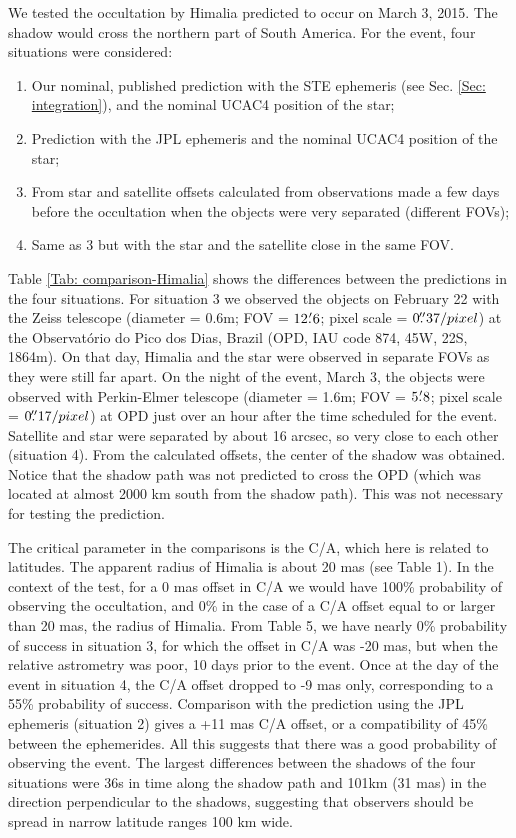 \documentclass[useAMS,usenatbib]{mn2e}
\begin{document}
We tested the occultation by Himalia predicted to occur on March 3, 2015. The shadow would cross the northern part of South America. For the event, four situations were considered:
\begin{enumerate}[I]
\item Our nominal, published prediction with the STE ephemeris (see Sec. \ref{Sec: integration}), and the nominal UCAC4 position of the star;
\item Prediction with the JPL ephemeris and the nominal UCAC4 position of the star;
\item From star and satellite offsets calculated from observations made a few days before the occultation when the objects were very separated (different FOVs);
\item Same as 3 but with the star and the satellite close in the same FOV.
\end{enumerate}

Table \ref{Tab: comparison-Himalia} shows the differences between the predictions in the four situations. For situation 3 we observed the objects on February 22 with the Zeiss telescope (diameter = 0.6m; FOV = $12\hbox{$.\mkern-4mu^\prime$}6$; pixel scale = $0\hbox{$.\!\!^{\prime\prime}$}37 / pixel$) at the Observatório do Pico dos Dias, Brazil (OPD, IAU code 874, 45\arcsec W, 22\arcsec S, 1864m). On that day, Himalia and the star were observed in separate FOVs as they were still far apart. On the night of the event, March 3, the objects were observed with Perkin-Elmer telescope (diameter = 1.6m; FOV = $5\hbox{$.\mkern-4mu^\prime$}8$; pixel scale = $0\hbox{$.\!\!^{\prime\prime}$}17 / pixel$) at OPD just over an hour after the time scheduled for the event. Satellite and star were separated by about 16 arcsec, so very close to each other (situation 4). From the calculated offsets, the center of the shadow was obtained. Notice that the shadow path was not predicted to cross the OPD (which was located at almost 2000 km south from the shadow path). This was not necessary for testing the prediction.

The critical parameter in the comparisons is the C/A, which here is related to latitudes. The apparent radius of Himalia is about 20 mas (see Table 1). In the context of the test, for a 0 mas offset in C/A we would have 100\% probability of observing the occultation, and 0\% in the case of a C/A offset equal to or larger than 20 mas, the radius of Himalia. From Table 5, we have nearly 0\% probability of success in situation 3, for which the offset in C/A was -20 mas, but when the relative astrometry was poor, 10 days prior to the event. Once at the day of the event in situation 4, the C/A offset dropped to -9 mas only, corresponding to a 55\% probability of success. Comparison with the prediction using the JPL ephemeris (situation 2) gives a +11 mas C/A offset, or a compatibility of 45\% between the ephemerides. All this suggests that there was a good probability of observing the event. The largest differences between the shadows of the four situations were 36s in time along the shadow path and 101km (31 mas) in the direction perpendicular to the shadows, suggesting that observers should be spread in narrow latitude ranges 100 km wide.
\end{document}

